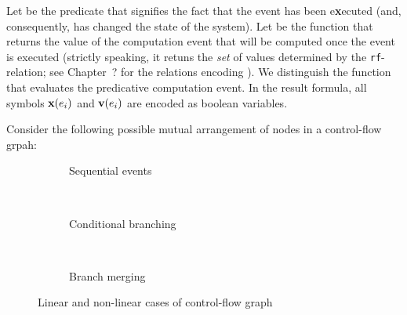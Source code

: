 Let  be the predicate that signifies the fact that the event has been e\textbf{x}ecuted (and, consequently, has changed the state of the system). 
Let  be the function that returns the value of the computation event that will be computed once the event is executed (strictly speaking, it retuns the \textit{set} of values determined by the \texttt{rf}-relation; see Chapter~? for the relations encoding%
). We distinguish the function  that evaluates the predicative computation event. In the result formula, all symbols $\mathbf{x}(e_i)$ and $\mathbf{v}(e_i)$ are encoded as boolean variables.

Consider the following possible mutual arrangement of nodes in a control-flow grpah:

\begin{figure}[H]
\centering
\begin{subfigure}[b]{0.3\textwidth}
\caption{Sequential events}
\label{encode:cf:seq}
\end{subfigure}
~
\begin{subfigure}[b]{0.35\textwidth}
\caption{Conditional branching}
\label{encode:cf:br}
\end{subfigure}
~
\begin{subfigure}[b]{0.25\textwidth}
\caption{Branch merging}
\label{encode:cf:merge}
\end{subfigure}
\caption{Linear and non-linear cases of control-flow graph}
\label{encode:cf}
\end{figure}

